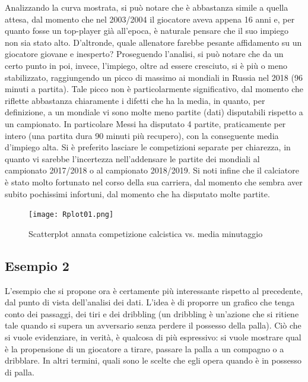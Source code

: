             Analizzando la curva mostrata, si può notare che è abbastanza simile a quella attesa, dal momento che nel 2003/2004 il giocatore aveva appena 16 anni e, per quanto fosse un top-player già all'epoca, è naturale pensare che il suo impiego non sia stato alto. D'altronde, quale allenatore farebbe pesante affidamento su un giocatore giovane e inesperto? Proseguendo l'analisi, si può notare che da un certo punto in poi, invece, l'impiego, oltre ad essere cresciuto, si è più o meno stabilizzato, raggiungendo un picco di massimo ai mondiali in Russia nel 2018 (96 minuti a partita). Tale picco non è particolarmente significativo, dal momento che riflette abbastanza chiaramente i difetti che ha la media, in quanto, per definizione, a un mondiale vi sono molte meno partite (dati) disputabili rispetto a un campionato. In particolare Messi ha disputato 4 partite, praticamente per intero (una partita dura 90 minuti più recupero), con la conseguente media d'impiego alta. Si è preferito lasciare le competizioni separate per chiarezza, in quanto vi sarebbe l'incertezza nell'addensare le partite dei mondiali al campionato 2017/2018 o al campionato 2018/2019. Si noti infine che il calciatore è stato molto fortunato nel corso della sua carriera, dal momento che sembra aver subito pochissimi infortuni, dal momento che ha disputato molte partite.

            \begin{figure}[h]
                \texttt{[image: Rplot01.png]}
                \centering
                \caption{Scatterplot annata competizione calcistica vs. media minutaggio}
                \label{fig:plot1}
            \end{figure}

        \newpage

        \subsection{Esempio 2}
            L'esempio che si propone ora è certamente più interessante rispetto al precedente, dal punto di vista dell'analisi dei dati. L'idea è di proporre un grafico che tenga conto dei passaggi, dei tiri e dei dribbling (un dribbling è un'azione che si ritiene tale quando si supera un avversario senza perdere il possesso della palla). Ciò che si vuole evidenziare, in verità, è qualcosa di più espressivo: si vuole mostrare qual è la propensione di un giocatore a tirare, passare la palla a un compagno o a dribblare. In altri termini, quali sono le scelte che egli opera quando è in possesso di palla. 
            
